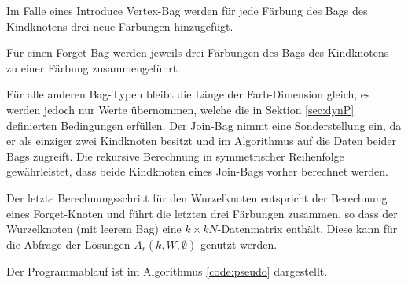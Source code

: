 Im Falle eines \glqq Introduce Vertex\grqq -Bag werden für jede Färbung des Bags des Kindknotens drei neue Färbungen hinzugefügt.

Für einen \glqq Forget\grqq -Bag werden jeweils drei Färbungen des Bags des Kindknotens zu einer Färbung zusammengeführt.

Für alle anderen Bag-Typen bleibt die Länge der Farb-Dimension gleich, es werden jedoch nur Werte übernommen, welche die in Sektion \ref{sec:dynP} definierten Bedingungen erfüllen. 
Der \glqq Join\grqq -Bag nimmt eine Sonderstellung ein, da er als einziger zwei Kindknoten besitzt und im Algorithmus auf die Daten beider Bags zugreift. 
Die rekursive Berechnung in symmetrischer Reihenfolge gewährleistet, dass beide Kindknoten eines \glqq Join\grqq -Bags vorher berechnet werden.
 
Der letzte Berechnungsschritt für den Wurzelknoten entspricht der Berechnung eines \glqq Forget\grqq -Knoten und führt die letzten drei Färbungen zusammen, so dass der Wurzelknoten (mit leerem Bag) eine $k \times kN$-Datenmatrix enthält. 
Diese kann für die Abfrage der Lösungen $A_r(k,W,\emptyset)$ genutzt werden.

Der Programmablauf ist im Algorithmus \ref{code:pseudo} dargestellt.

